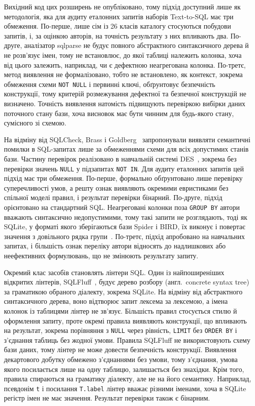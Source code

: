 \documentclass[a4paper,14pt,oneside]{extreport}
\begin{document}
Вихідний код цих розширень не опубліковано, тому підхід доступний лише як методологія, яка для аудиту еталонних запитів наборів Text-to-SQL має три обмеження. По-перше, лише сім із 26 класів каталогу стосуються побудови запитів, і, за оцінкою авторів, на точність результату з них впливають два. По-друге, аналізатор sqlparse не будує повного абстрактного синтаксичного дерева й не розв'язує імен, тому не встановлює, до якої таблиці належить колонка, хоча від цього залежить, наприклад, чи є дефектною неагрегована колонка. По-третє, метод виявлення не формалізовано, тобто не встановлено, як контекст, зокрема обмеження схеми \texttt{NOT~NULL} і первинні ключі, обґрунтовує безпечність конструкції, тому критерій розмежування дефектної та безпечної конструкцій не визначено. Точність виявлення натомість підвищують перевіркою вибірки даних поточного стану бази, хоча висновок має бути чинним для будь-якого стану, сумісного зі схемою.

На відміну від SQLCheck, Brass і Goldberg~\cite{brass2006semantic} запропонували виявляти семантичні помилки в SQL-запитах лише за обмеженнями схеми для всіх допустимих станів бази. Частину перевірок реалізовано в навчальній системі DES~\cite{saenz2019clp,desSystem}, зокрема без перевірки значень \texttt{NULL} у підзапитах \texttt{NOT~IN}. Для аудиту еталонних запитів цей підхід має три обмеження. По-перше, формально обґрунтовано лише перевірку суперечливості умов, а решту ознак виявляють окремими евристиками без спільної моделі правил, і результат перевірки бінарний. По-друге, підхід орієнтовано на стандартний SQL. Неагреговані колонки поза \texttt{GROUP~BY} автори вважають синтаксично недопустимими, тому такі запити не розглядають, тоді як SQLite, у форматі якого зберігаються бази Spider і BIRD, їх виконує і повертає значення з довільного рядка групи~\cite{sqliteBareColumns}. По-третє, підхід апробовано на навчальних запитах, і більшість ознак переліку автори відносять до надлишкових або неефективних формулювань, що не змінюють результату запиту.

Окремий клас засобів становлять лінтери SQL. Один із найпоширеніших відкритих лінтерів, SQLFluff~\cite{sqlfluff}, будує дерево розбору (англ.~concrete syntax tree) за граматикою обраного діалекту, зокрема SQLite. На відміну від абстрактного синтаксичного дерева, воно відтворює запит лексема за лексемою, а імена колонок із таблицями лінтер не зв'язує. Більшість правил стосується стилю й оформлення запиту, проте окремі правила виявляють конструкції, що впливають на результат, зокрема порівняння з \texttt{NULL} через рівність, \texttt{LIMIT} без \texttt{ORDER~BY} і з'єднання таблиць без жодної умови. Правила SQLFluff не використовують схему бази даних, тому лінтер не може довести безпечність конструкції. Виявлення декартового добутку обмежено з'єднаннями без умови, тому з'єднання, умова якого посилається лише на одну таблицю, залишається без знахідки. Крім того, правила спираються на граматику діалекту, але не на його семантику. Наприклад, псевдонім \texttt{t} і посилання \texttt{T.label} лінтер вважає різними іменами, хоча в SQLite регістр імен не має значення. Результат перевірки також є бінарним.
\end{document}
